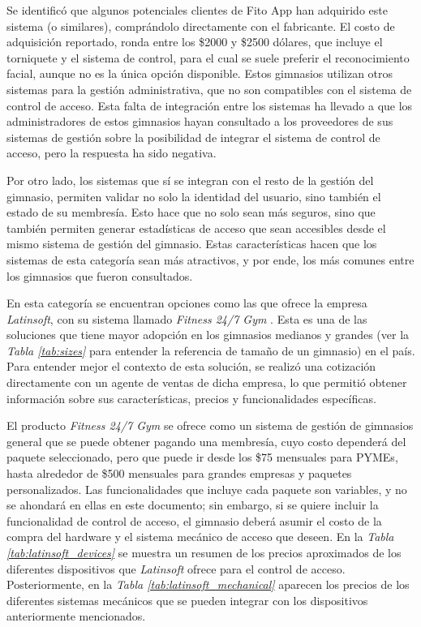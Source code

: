 Se identificó que algunos potenciales clientes de Fito App han adquirido este sistema (o similares), comprándolo directamente con el fabricante. El costo de adquisición reportado, ronda entre los \$2000 y \$2500 dólares, que incluye el torniquete y el sistema de control, para el cual se suele preferir el reconocimiento facial, aunque no es la única opción disponible. Estos gimnasios utilizan otros sistemas para la gestión administrativa, que no son compatibles con el sistema de control de acceso. Esta falta de integración entre los sistemas ha llevado a que los administradores de estos gimnasios hayan consultado a los proveedores de sus sistemas de gestión sobre la posibilidad de integrar el sistema de control de acceso, pero la respuesta ha sido negativa.

Por otro lado, los sistemas que sí se integran con el resto de la gestión del gimnasio, permiten validar no solo la identidad del usuario, sino también el estado de su membresía. Esto hace que no solo sean más seguros, sino que también permiten generar estadísticas de acceso que sean accesibles desde el mismo sistema de gestión del gimnasio. Estas características hacen que los sistemas de esta categoría sean más atractivos, y por ende, los más comunes entre los gimnasios que fueron consultados.

En esta categoría se encuentran opciones como las que ofrece la empresa \textit{Latinsoft}, con su sistema llamado \textit{Fitness 24/7 Gym} \cite{latinsoft}. Esta es una de las soluciones que tiene mayor adopción en los gimnasios medianos y grandes (ver la \textit{Tabla \ref{tab:sizes}} para entender la referencia de tamaño de un gimnasio) en el país. Para entender mejor el contexto de esta solución, se realizó una cotización directamente con un agente de ventas de dicha empresa, lo que permitió obtener información sobre sus características, precios y funcionalidades específicas. 

El producto \textit{Fitness 24/7 Gym} se ofrece como un sistema de gestión de gimnasios general que se puede obtener pagando una membresía, cuyo costo dependerá del paquete seleccionado, pero que puede ir desde los \$75 mensuales para PYMEs, hasta alrededor de  \$500 mensuales para grandes empresas y paquetes personalizados. Las funcionalidades que incluye cada paquete son variables, y no se ahondará en ellas en este documento; sin embargo, si se quiere incluir la funcionalidad de control de acceso, el gimnasio deberá asumir el costo de la compra del hardware y el sistema mecánico de acceso que deseen. En la \textit{Tabla \ref{tab:latinsoft_devices}} se muestra un resumen de los precios aproximados de los diferentes dispositivos que \textit{Latinsoft} ofrece para el control de acceso. Posteriormente, en la \textit{Tabla \ref{tab:latinsoft_mechanical}} aparecen los precios de los diferentes sistemas mecánicos que se pueden integrar con los dispositivos anteriormente mencionados.

